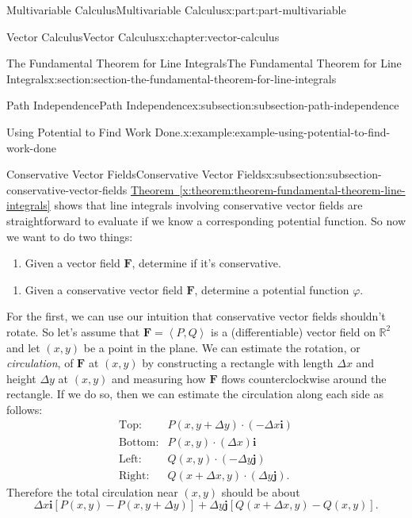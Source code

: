 \documentclass[twoside,10pt,]{book}
\newcommand{\xreffont}{\relax}
\numberwithin{equation}{part}
\newcommand{\RR}{\mathbb{R}}
\newcommand{\vb}[1]{\mathbf{#1}}
\newcommand{\dotprod}[1]{\left\langle #1 \right\rangle}
\newcommand{\brackets}[1]{\left[ #1 \right]}
\newcommand{\amp}{&}
\begin{document}
\begin{partptx}{Multivariable Calculus}{}{Multivariable Calculus}{}{}{x:part:part-multivariable}
\begin{chapterptx}{Vector Calculus}{}{Vector Calculus}{}{}{x:chapter:vector-calculus}
\begin{sectionptx}{The Fundamental Theorem for Line Integrals}{}{The Fundamental Theorem for Line Integrals}{}{}{x:section:section-the-fundamental-theorem-for-line-integrals}
\begin{subsectionptx}{Path Independence}{}{Path Independence}{}{}{x:subsection:subsection-path-independence}
\begin{example}{Using Potential to Find Work Done.}{x:example:example-using-potential-to-find-work-done}
\end{example}
\end{subsectionptx}
%
%
\typeout{************************************************}
\typeout{************************************************}
%
\begin{subsectionptx}{Conservative Vector Fields}{}{Conservative Vector Fields}{}{}{x:subsection:subsection-conservative-vector-fields}
\hyperref[x:theorem:theorem-fundamental-theorem-line-integrals]{Theorem~{\xreffont\ref{x:theorem:theorem-fundamental-theorem-line-integrals}}} shows that line integrals involving conservative vector fields are straightforward to evaluate if we know a corresponding potential function. So now we want to do two things:%
\begin{enumerate}
\item{}Given a vector field \(\vb{F}\), determine if it's conservative.%
\end{enumerate}
%
\begin{enumerate}
\item{}Given a conservative vector field \(\vb{F}\), determine a potential function \(\varphi\).%
\end{enumerate}
%
\par
For the first, we can use our intuition that conservative vector fields shouldn't rotate. So let's assume that \(\vb{F} = \dotprod{P,Q}\) is a (differentiable) vector field on \(\RR^{2}\) and let \((x,y)\) be a point in the plane. We can estimate the rotation, or \emph{circulation}, of \(\vb{F}\) at \((x,y)\) by constructing a rectangle with length \(\Delta x\) and height \(\Delta y\) at \((x,y)\) and measuring how \(\vb{F}\) flows counterclockwise around the rectangle. If we do so, then we can estimate the circulation along each side as follows:%
\begin{align*}
\text{Top:} \amp P(x,y + \Delta y)\cdot(-\Delta x\vb{i})\\
\text{Bottom:} \amp P(x, y)\cdot(\Delta x)\vb{i}\\
\text{Left:} \amp Q(x,y)\cdot(-\Delta y\vb{j})\\
\text{Right:} \amp Q(x + \Delta x,y)\cdot(\Delta y\vb{j})\text{.}
\end{align*}
Therefore the total circulation near \((x,y)\) should be about%
\begin{equation*}
\Delta x\vb{i}\brackets{P(x,y) - P(x, y + \Delta y)} + \Delta y\vb{j}\brackets{Q(x + \Delta x, y) - Q(x,y)}\text{.}
\end{equation*}

\end{subsectionptx}
\end{sectionptx}
\end{chapterptx}
\end{partptx}
\end{document}
